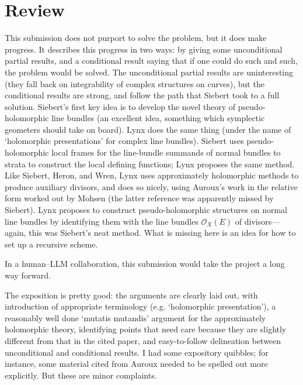 \documentclass[11pt]{article}
\theoremstyle{definition}
\theoremstyle{remark}
\begin{document}
\maketitle

\section{Review}

This submission does not purport to solve the problem, but it does make progress. It describes this progress in two ways: by giving some unconditional partial results, and a conditional result saying that if one could do such and such, the problem would be solved.  The unconditional partial results are uninteresting (they fall back on integrability of complex structures on curves), but the conditional results are strong, and follow the path that Siebert took to a full solution. Siebert's first key idea is to develop the novel theory of pseudo-holomorphic line bundles (an excellent idea, something which symplectic geometers should take on board). Lynx does the same thing (under the name of `holomorphic presentations' for complex line bundles). Siebert uses pseudo-holomorphic local frames for the line-bundle summands of normal bundles to strata to construct the local defining functions; Lynx proposes the same method. Like Siebert, Heron, and Wren, Lynx uses approximately holomorphic methods to produce auxiliary divisors, and does so nicely, using Auroux's work in the relative form worked out by Mohsen (the latter reference was apparently missed by Siebert). Lynx proposes to construct pseudo-holomorphic structures on normal line bundles by identifying them with the line bundles $\mathcal{O}_X(E)$ of divisors---again, this was Siebert's neat method. What is missing here is an idea for how to set up a recursive scheme.

In a human--LLM collaboration, this submission would take the project a long way forward. 

The exposition is pretty good: the arguments are clearly laid out, with introduction of appropriate terminology (e.g. `holomorphic presentation'), a reasonably well done `mutatis mutandis' argument for the approximately holomorphic theory, identifying points that need care because they are slightly different from that in the cited paper, and easy-to-follow delineation between unconditional and conditional results.  I had some expository quibbles; for instance, some material cited from Auroux needed to be spelled out more explicitly. But these are minor complaints.
 
\end{document}
